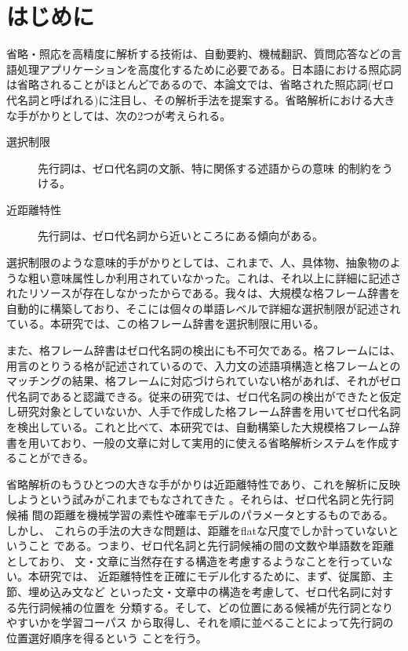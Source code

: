 \documentclass{nlp}
\begin{document}


\newcommand{\sm}[1]{}

\newcommand{\itemex}{}
\def\ex#1{}

\maketitle

\section{はじめに}
\label{はじめに}

省略・照応を高精度に解析する技術は、自動要約、機械翻訳、質問応答などの言
語処理アプリケーションを高度化するために必要である。日本語における照応詞
は省略されることがほとんどであるので、本論文では、省略された照応詞(ゼロ
代名詞と呼ばれる)に注目し、その解析手法を提案する。省略解析における大き
な手がかりとしては、次の2つが考えられる。

\begin{description}
 \item[選択制限] 先行詞は、ゼロ代名詞の文脈、特に関係する述語からの意味
	    的制約をうける。
 \item[近距離特性] 先行詞は、ゼロ代名詞から近いところにある傾向がある。
\end{description}

選択制限のような意味的手がかりとしては、これまで、人、具体物、抽象物のよ
うな粗い意味属性しか利用されていなかった。これは、それ以上に詳細に記述さ
れたリソースが存在しなかったからである。我々は、大規模な格フレーム辞書を
自動的に構築しており、そこには個々の単語レベルで詳細な選択制限が記述され
ている。本研究では、この格フレーム辞書を選択制限に用いる。

また、格フレーム辞書はゼロ代名詞の検出にも不可欠である。格フレームには、
用言のとりうる格が記述されているので、入力文の述語項構造と格フレームとの
マッチングの結果、格フレームに対応づけられていない格があれば、それがゼロ
代名詞であると認識できる。従来の研究では、ゼロ代名詞の検出ができたと仮定
し研究対象としていないか、人手で作成した格フレーム辞書を用いてゼロ代名詞
を検出している。これと比べて、本研究では、自動構築した大規模格フレーム辞
書を用いており、一般の文章に対して実用的に使える省略解析システムを作成す
ることができる。

省略解析のもうひとつの大きな手がかりは近距離特性であり、これを解析に反映
しようという試みがこれまでもなされてきた
\cite{Aone1995,Yoshino2001,Seki2002b}。それらは、ゼロ代名詞と先行詞候補
間の距離を機械学習の素性や確率モデルのパラメータとするものである。しかし、
これらの手法の大きな問題は、距離をflatな尺度でしか計っていないということ
である。つまり、ゼロ代名詞と先行詞候補の間の文数や単語数を距離としており、
文・文章に当然存在する構造を考慮するようなことを行っていない。本研究では、
近距離特性を正確にモデル化するために、まず、従属節、主節、埋め込み文など
といった文・文章中の構造を考慮して、ゼロ代名詞に対する先行詞候補の位置を
分類する。そして、どの位置にある候補が先行詞となりやすいかを学習コーパス
から取得し、それを順に並べることによって先行詞の位置選好順序を得るという
ことを行う。
\end{document}
